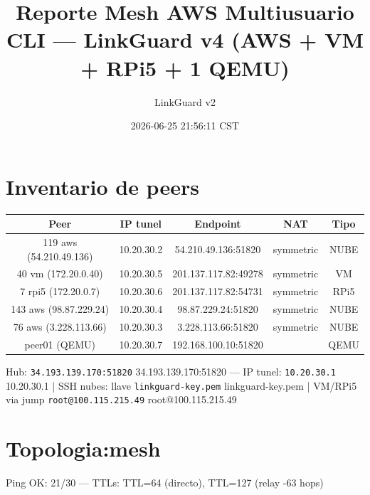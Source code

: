 \documentclass[11pt,a4paper]{article}
\title{Reporte Mesh AWS Multiusuario CLI — LinkGuard v4 (AWS + VM + RPi5 + 1 QEMU)}
\author{LinkGuard v2}
\date{2026-06-25 21:56:11 CST}
\begin{document}
\maketitle

\section{Inventario de peers}
\begin{longtable}{|c|c|c|c|c|}
\hline
Peer & IP tunel & Endpoint & NAT & Tipo \\ \hline
119 aws (54.210.49.136) & 10.20.30.2 & 54.210.49.136:51820 & symmetric & NUBE \\ \hline
40 vm (172.20.0.40) & 10.20.30.5 & 201.137.117.82:49278 & symmetric & VM \\ \hline
7 rpi5 (172.20.0.7) & 10.20.30.6 & 201.137.117.82:54731 & symmetric & RPi5 \\ \hline
143 aws (98.87.229.24) & 10.20.30.4 & 98.87.229.24:51820 & symmetric & NUBE \\ \hline
76 aws (3.228.113.66) & 10.20.30.3 & 3.228.113.66:51820 & symmetric & NUBE \\ \hline
peer01 (QEMU) & 10.20.30.7 & 192.168.100.10:51820 &  & QEMU \\ \hline
\end{longtable}

Hub:  \texttt{34.193.139.170:51820} 34.193.139.170:51820  — IP tunel:  \texttt{10.20.30.1} 10.20.30.1  | SSH nubes: llave  \texttt{linkguard-key.pem} linkguard-key.pem  | VM/RPi5 via jump  \texttt{root@100.115.215.49} root@100.115.215.49\\

\section{Topologia:mesh}
Ping OK: 21/30 — TTLs: TTL=64 (directo), TTL=127 (relay -63 hops)\\
\end{document}
